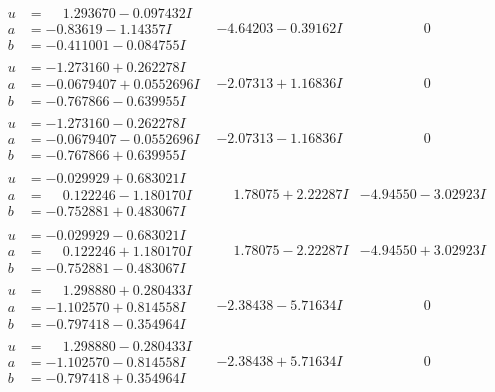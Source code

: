 \documentclass[1p]{elsarticle_modified}
\theoremstyle{definition}
\begin{document}
$$\begin{array}{c|c|c}
\begin{aligned}
u &= \phantom{-}1.293670 - 0.097432 I \\
a &= -0.83619 - 1.14357 I \\
b &= -0.411001 - 0.084755 I\end{aligned}
 & -4.64203 - 0.39162 I & \phantom{-0.000000 } 0 \\ \hline\begin{aligned}
u &= -1.273160 + 0.262278 I \\
a &= -0.0679407 + 0.0552696 I \\
b &= -0.767866 - 0.639955 I\end{aligned}
 & -2.07313 + 1.16836 I & \phantom{-0.000000 } 0 \\ \hline\begin{aligned}
u &= -1.273160 - 0.262278 I \\
a &= -0.0679407 - 0.0552696 I \\
b &= -0.767866 + 0.639955 I\end{aligned}
 & -2.07313 - 1.16836 I & \phantom{-0.000000 } 0 \\ \hline\begin{aligned}
u &= -0.029929 + 0.683021 I \\
a &= \phantom{-}0.122246 - 1.180170 I \\
b &= -0.752881 + 0.483067 I\end{aligned}
 & \phantom{-}1.78075 + 2.22287 I & -4.94550 - 3.02923 I \\ \hline\begin{aligned}
u &= -0.029929 - 0.683021 I \\
a &= \phantom{-}0.122246 + 1.180170 I \\
b &= -0.752881 - 0.483067 I\end{aligned}
 & \phantom{-}1.78075 - 2.22287 I & -4.94550 + 3.02923 I \\ \hline\begin{aligned}
u &= \phantom{-}1.298880 + 0.280433 I \\
a &= -1.102570 + 0.814558 I \\
b &= -0.797418 - 0.354964 I\end{aligned}
 & -2.38438 - 5.71634 I & \phantom{-0.000000 } 0 \\ \hline\begin{aligned}
u &= \phantom{-}1.298880 - 0.280433 I \\
a &= -1.102570 - 0.814558 I \\
b &= -0.797418 + 0.354964 I\end{aligned}
 & -2.38438 + 5.71634 I & \phantom{-0.000000 } 0 \\ \hline\begin{aligned}

\end{aligned}
\end{array}$$
\end{document}
